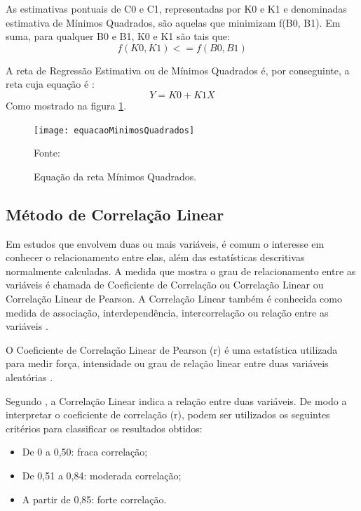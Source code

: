 As estimativas pontuais de C0 e C1, representadas por K0 e K1 e denominadas estimativa de Mínimos Quadrados, são aquelas que minimizam f(B0, B1). Em suma,  para qualquer B0 e B1, K0 e K1 são tais que:
\begin{equation}
f(K0,K1) <= f(B0,B1)
\end{equation}

A reta de Regressão Estimativa ou de Mínimos Quadrados é, por conseguinte, a reta cuja equação é :
\begin{equation}
Y = K0 + K1X 
\end{equation}
Como mostrado na figura \ref{equacaoMinimos}\cite[p.~441]{devore2006}.

\graphicspath{{figuras/}}
\begin{figure}[H]
\centering
\texttt{[image: equacaoMinimosQuadrados]}
\caption{Equação da reta Mínimos Quadrados.}{Fonte: } 
\label{equacaoMinimos}
\end{figure}

\subsection{Método de Correlação Linear}

Em estudos que envolvem duas ou mais variáveis, é comum o interesse em conhecer o relacionamento entre elas, além das estatísticas descritivas normalmente calculadas. A medida que mostra o grau de relacionamento entre as variáveis é chamada de Coeficiente de Correlação ou Correlação Linear ou Correlação Linear de Pearson. A Correlação Linear também é conhecida como medida de associação, interdependência, intercorrelação ou relação entre as variáveis \cite[p.~62]{lira2004}.

O Coeficiente de Correlação Linear de Pearson (r) é uma estatística utilizada para medir força, intensidade ou grau de relação linear entre duas variáveis aleatórias \cite[p.~664]{ferreira2009}.

Segundo \cite[p.~134]{lopes2005}, a Correlação Linear indica a relação entre duas variáveis. De modo a interpretar o coeficiente de correlação (r), podem ser utilizados os seguintes critérios para classificar os resultados obtidos:

\begin{itemize}
\item De 0 a 0,50: fraca correlação; 
\item De 0,51 a 0,84: moderada correlação;
\item A partir de 0,85: forte correlação.
\end{itemize}

